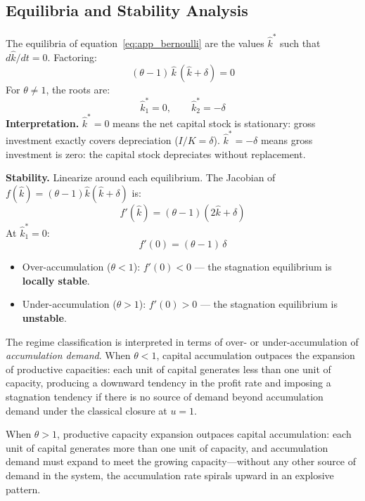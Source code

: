 \subsection{Equilibria and Stability Analysis}
\label{app:stability}

The equilibria of equation~\eqref{eq:app_bernoulli} are the values $\hat{k}^*$ such that $d\hat{k}/dt = 0$. Factoring:
%
\begin{equation}\label{eq:app_equilibria}
	(\theta - 1)\,\hat{k}\,(\hat{k} + \delta) = 0
\end{equation}
%
For $\theta \neq 1$, the roots are:
%
\begin{equation}\label{eq:app_roots}
	\hat{k}_1^* = 0, \qquad \hat{k}_2^* = -\delta
\end{equation}
%
\textbf{Interpretation.} $\hat{k}^* = 0$ means the net capital stock is stationary: gross investment exactly covers depreciation ($I/K = \delta$). $\hat{k}^* = -\delta$ means gross investment is zero: the capital stock depreciates without replacement.

\textbf{Stability.} Linearize around each equilibrium. The Jacobian of $f(\hat{k}) = (\theta-1)\hat{k}(\hat{k}+\delta)$ is:
%
\begin{equation}\label{eq:app_jacobian}
	f'(\hat{k}) = (\theta - 1)(2\hat{k} + \delta)
\end{equation}
%
At $\hat{k}_1^* = 0$:
%
\begin{equation}
	f'(0) = (\theta - 1)\,\delta
\end{equation}
%
\begin{itemize}
	\item Over-accumulation ($\theta < 1$): $f'(0) < 0$ — the stagnation equilibrium is \textbf{locally stable}.
	\item Under-accumulation ($\theta > 1$): $f'(0) > 0$ — the stagnation equilibrium is \textbf{unstable}.
\end{itemize}

The regime classification is interpreted in terms of over- or under-accumulation of \textit{accumulation demand}. When $\theta < 1$, capital accumulation outpaces the expansion of productive capacities: each unit of capital generates less than one unit of capacity, producing a downward tendency in the profit rate and imposing a stagnation tendency if there is no source of demand beyond accumulation demand under the classical closure at $u = 1$.

When $\theta > 1$, productive capacity expansion outpaces capital accumulation: each unit of capital generates more than one unit of capacity, and accumulation demand must expand to meet the growing capacity---without any other source of demand in the system, the accumulation rate spirals upward in an explosive pattern.



